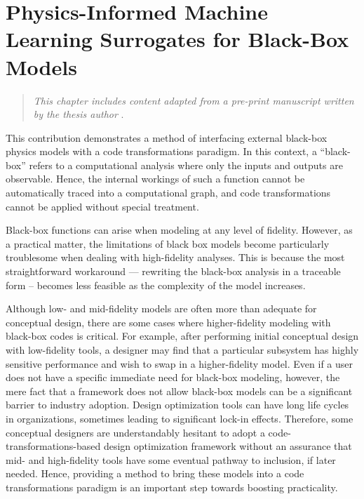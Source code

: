 \chapter{Physics-Informed Machine Learning Surrogates for Black-Box Models}
\label{chap:physics-informed-ml}

\begin{quote}
    \emph{This chapter includes content adapted from a pre-print manuscript written by the thesis author} \cite{neuralfoil_preprint, neuralfoil_github}.
\end{quote}

This contribution demonstrates a method of interfacing external black-box physics models with a code transformations paradigm. In this context, a ``black-box'' refers to a computational analysis where only the inputs and outputs are observable. Hence, the internal workings of such a function cannot be automatically traced into a computational graph, and code transformations cannot be applied without special treatment.

Black-box functions can arise when modeling at any level of fidelity. However, as a practical matter, the limitations of black box models become particularly troublesome when dealing with high-fidelity analyses. This is because the most straightforward workaround — rewriting the black-box analysis in a traceable form -- becomes less feasible as the complexity of the model increases.

Although low- and mid-fidelity models are often more than adequate for conceptual design, there are some cases where higher-fidelity modeling with black-box codes is critical. For example, after performing initial conceptual design with low-fidelity tools, a designer may find that a particular subsystem has highly sensitive performance and wish to swap in a higher-fidelity model. Even if a user does not have a specific immediate need for black-box modeling, however, the mere fact that a framework does not allow black-box models can be a significant barrier to industry adoption. Design optimization tools can have long life cycles in organizations, sometimes leading to significant lock-in effects. Therefore, some conceptual designers are understandably hesitant to adopt a code-transformations-based design optimization framework without an assurance that mid- and high-fidelity tools have some eventual pathway to inclusion, if later needed. Hence, providing a method to bring these models into a code transformations paradigm is an important step towards boosting practicality.

